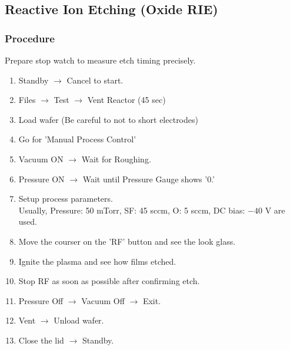 \subsection{Reactive Ion Etching (Oxide RIE)}
\subsubsection{Procedure}
Prepare stop watch to measure etch timing precisely.
\begin{enumerate}
\item Standby $\rightarrow$ Cancel to start.
\item Files $\rightarrow$ Test $\rightarrow$ Vent Reactor (45 sec)
\item Load wafer (Be careful to not to short electrodes)
\item Go for 'Manual Process Control'
\item Vacuum ON $\rightarrow$ Wait for Roughing.
\item Pressure ON $\rightarrow$ Wait until Pressure Gauge shows '0.'
\item Setup process parameters. \\
  Usually, Pressure: 50 mTorr, SF: 45 sccm, O: 5 sccm, DC bias: $-40$ V are used.
\item Move the courser on the 'RF' button and see the look glass.
\item Ignite the plasma and see how films etched.
\item Stop RF as soon as possible after confirming etch.
\item Pressure Off $\rightarrow$ Vacuum Off $\rightarrow$ Exit.
\item Vent $\rightarrow$ Unload wafer.
\item Close the lid $\rightarrow$ Standby. 
\end{enumerate}
